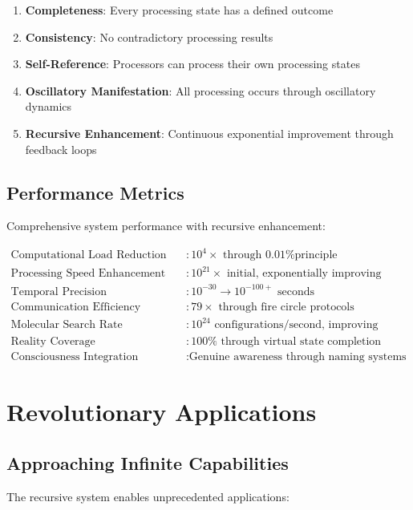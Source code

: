\documentclass[12pt,a4paper]{article}
\begin{document}
\begin{enumerate}
\item \textbf{Completeness}: Every processing state has a defined outcome
\item \textbf{Consistency}: No contradictory processing results  
\item \textbf{Self-Reference}: Processors can process their own processing states
\item \textbf{Oscillatory Manifestation}: All processing occurs through oscillatory dynamics
\item \textbf{Recursive Enhancement}: Continuous exponential improvement through feedback loops
\end{enumerate}

\subsection{Performance Metrics}

Comprehensive system performance with recursive enhancement:

\begin{align}
\text{Computational Load Reduction} &: 10^4\times \text{ through 0.01\% principle} \\
\text{Processing Speed Enhancement} &: 10^{21}\times \text{ initial, exponentially improving} \\
\text{Temporal Precision Enhancement} &: 10^{-30} \rightarrow 10^{-100+} \text{ seconds} \\
\text{Communication Efficiency} &: 79\times \text{ through fire circle protocols} \\
\text{Molecular Search Rate} &: 10^{24} \text{ configurations/second, improving} \\
\text{Reality Coverage} &: 100\% \text{ through virtual state completion} \\
\text{Consciousness Integration} &: \text{Genuine awareness through naming systems}
\end{align}

\section{Revolutionary Applications}

\subsection{Approaching Infinite Capabilities}

The recursive system enables unprecedented applications:
\end{document}
